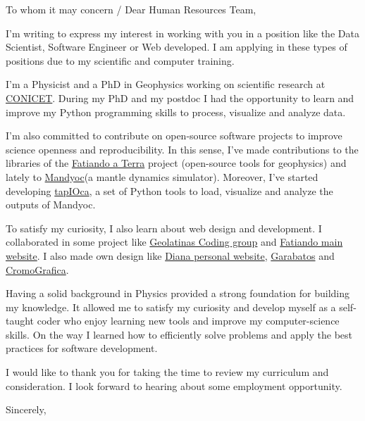 \documentclass[a4paper,10pt]{letter}
\date{February 25, 2021}
\begin{document}
\begin{letter}
{To whom it may concern / Dear Human Resources Team,}
\opening{}

I'm writing to express my interest in working with you in a position like the 
Data Scientist, Software Engineer or Web developed.
I am applying in these types of positions due to my scientific and computer 
training. 

I'm a Physicist and a PhD in Geophysics working on scientific research at
\href{https://www.conicet.gov.ar/}{CONICET}.
During my PhD and my postdoc I had the opportunity to learn and improve my
Python programming skills to process, visualize and analyze data. 

I'm also committed to contribute on open-source software projects to improve
science openness and reproducibility.
In this sense, I've made contributions to the libraries of the
\href{https://fatiando.org}{Fatiando a Terra} project (open-source tools for
geophysics) and lately to \href{https://github.com/ggciag/mandyoc}{Mandyoc}(a 
mantle dynamics simulator).
Moreover, I've started developing 
\href{https://github.com/aguspesce/tapioca}{tapIOca}, a set of Python tools to 
load, visualize and analyze the outputs of Mandyoc.

To satisfy my curiosity, I also learn about web design and development.
I collaborated in some project like 
\href{https://geolatinas.github.io/}{Geolatinas Coding group} and 
\href{https://www.fatiando.org/}{Fatiando main website}. 
I also made own design like \href{https://dianaceroallard.github.io/}{Diana 
personal website}, \href{https://aguspesce.github.io/garabatos/}{Garabatos} and 
\href{https://aguspesce.github.io/web-cromografica/}{CromoGrafica}. 

Having a solid background in Physics provided a strong foundation for building 
my knowledge.
It allowed me to satisfy my curiosity and develop myself as a self-taught coder 
who enjoy learning new tools and improve my computer-science skills.
On the way I learned how to efficiently solve problems and apply the best
practices for software development.

I would like to thank you for taking the time to review my curriculum and 
consideration. 
I look forward to hearing about some employment opportunity.


\closing{Sincerely,}


\end{letter}
\end{document}
